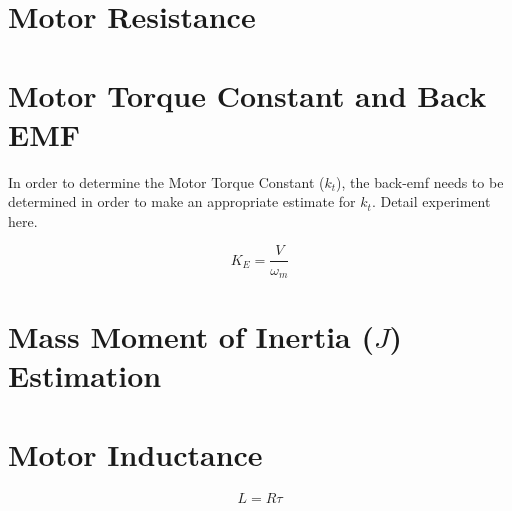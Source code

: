 
\section{Motor Resistance}

\section{Motor Torque Constant and Back EMF}
In order to determine the Motor Torque Constant (\(k_t\)), the back-emf needs to be determined in order to make an appropriate estimate for \(k_t\). Detail experiment here.

\[K_E = \frac{V}{\omega_m}\]


\section{Mass Moment of Inertia (\(J\)) Estimation}

\section{Motor Inductance}

\[L = R\tau\]